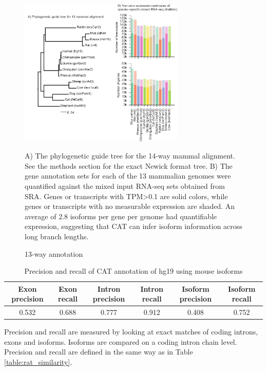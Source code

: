 \documentclass[fleqn,10pt]{wlscirep}
\begin{document}
\begin{figure}
\centering
\includegraphics[width=0.7\textwidth,height=0.7\textheight,keepaspectratio]{13way-v5.pdf}
\caption{13-way annotation}
A) The phylogenetic guide tree for the 14-way mammal alignment. See the methods section for the exact Newick format tree. B) The gene annotation sets for each of the 13 mammalian genomes were quantified against the mixed input RNA-seq sets obtained from SRA. Genes or transcripts with TPM\textgreater 0.1 are solid colors, while genes or transcripts with no measurable expression are shaded. An average of 2.8 isoforms per gene per genome had quantifiable expression, suggesting that CAT can infer isoform information across long branch lengths.
\label{fig:13way}
\end{figure}

\begin{table}
\centering
\begin{tabular}{|c|c|c|c|c|c|} \hline
Exon precision & Exon recall & Intron precision & Intron recall & Isoform precision & Isoform recall \\ \hline
0.532 & 0.688 & 0.777 & 0.912 & 0.408 & 0.752 \\ \hline
\end{tabular}
\vspace{5mm}

\caption{Precision and recall of CAT annotation of hg19 using mouse isoforms}
Precision and recall are measured by looking at exact matches of coding introns, exons and isoforms. Isoforms are compared on a coding intron chain level. Precision and recall are defined in the same way as in Table \ref{table:rat_similarity}.
\label{table:validation}
\end{table}
\end{document}
